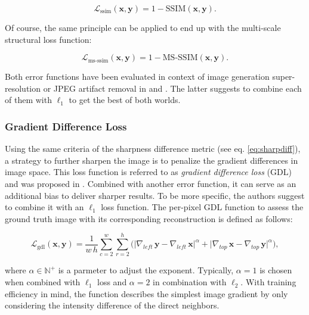 \begin{equation} \label{eq:ssim}
\mathcal{L}_{\textrm{ssim}}(\textbf{x}, \textbf{y}) = 1 - \textrm{SSIM}(\textbf{x}, \textbf{y}).
\end{equation}

Of course, the same principle can be applied to end up with the multi-scale structural loss function:

\begin{equation} \label{eq:msssim}
\mathcal{L}_{\textrm{ms-ssim}}(\textbf{x}, \textbf{y}) = 1 - \textrm{MS-SSIM}(\textbf{x}, \textbf{y}).
\end{equation}

Both error functions have been evaluated in context of image generation super-resolution or JPEG artifact removal in \parencite{learning-perc-sim} and \parencite{loss-func-img-proc}. The latter suggests to combine each of them with $ \ell_1 $ to get the best of both worlds.

\subsubsection*{Gradient Difference Loss} \label{sec:gdl}

Using the same criteria of the sharpness difference metric (see eq. \ref{eq:sharpdiff}), a strategy to further sharpen the image is to penalize the gradient differences in image space. This loss function is referred to as \textit{gradient difference loss} (GDL) and was proposed in \parencite{deep_multiscale_video_pred}. Combined with another error function, it can serve as an additional bias to deliver sharper results. To be more specific, the authors suggest to combine it with an $ \ell_1 $ loss function. The per-pixel GDL function to assess the ground truth image with its corresponding reconstruction is defined as follows:

\begin{equation} \label{eq:gdl}
\mathcal{L}_{\textrm{gdl}}(\textbf{x}, \textbf{y}) = \frac{1}{w \, h} \sum_{c=2}^{w} \sum_{r=2}^{h} \Big(\big|\nabla_{left} \, \textbf{y} - \nabla_{left} \, \textbf{x}\big|^{\alpha} + \big|\nabla_{top} \, \textbf{x} - \nabla_{top} \, \textbf{y}\big|^{\alpha}\Big) ,
\end{equation}

where $ \alpha \in \mathbb{N}^{+} $ is a parmeter to adjust the exponent. Typically, $ \alpha = 1 $ is chosen when combined with $ \ell_1 $ loss and $ \alpha = 2 $ in combination with $ \ell_2 $. With training efficiency in mind, the function describes the simplest image gradient by only considering the intensity difference of the direct neighbors.